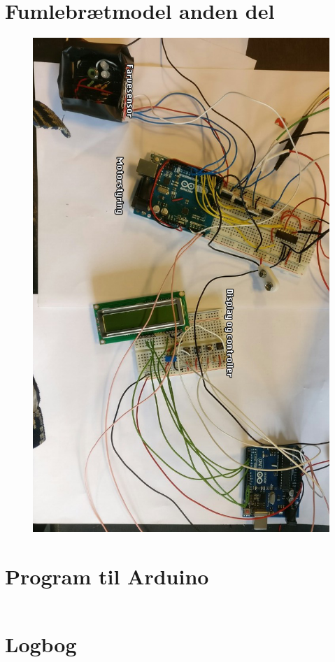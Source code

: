 \section{Fumlebrætmodel anden del}
\begin{figure}[H]
	\centering
    \includegraphics[width=13cm]{figures/2_5fremstilling/prototyper/rumleKreds.png}
	\caption{}
	\label{}
\end{figure}

\section{Program til Arduino}
\label{bilag:program}
\begin{lstlisting}

\end{lstlisting}


\section{Logbog} 